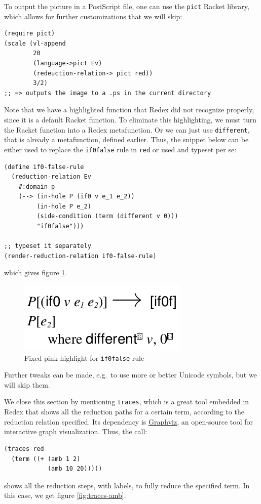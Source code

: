 To output the picture in a PostScript file, one can use the \texttt{pict}
Racket library, which allows for further customizations that we will skip:
{
  \small
\begin{verbatim}
(require pict)
(scale (vl-append
        20
        (language->pict Ev)
        (redeuction-relation-> pict red))
        3/2)
;; => outputs the image to a .ps in the current directory
\end{verbatim}
}

Note that we have a highlighted function that Redex did not recognize
properly, since it is a default Racket function. To eliminate this highlighting,
we must turn the Racket function into a Redex metafunction. Or we can just
use \texttt{different}, that is already a metafunction, defined earlier. Thus,
the snippet below can be either used to replace the \texttt{if0false} rule
in \texttt{red} or used and typeset per se:
{
  \small
\begin{verbatim}
(define if0-false-rule
  (reduction-relation Ev
    #:domain p
    (--> (in-hole P (if0 v e_1 e_2))
         (in-hole P e_2)
         (side-condition (term (different v 0)))
         "if0false")))

;; typeset it separately
(render-reduction-relation if0-false-rule)
\end{verbatim}
}
\noindent which gives figure \ref{fig:if0false}.

\begin{figure}[!htb]
  \centering
  \includegraphics[scale=0.3]{fig/if0false.png}
  \caption{Fixed pink highlight for \texttt{if0false} rule}
  \label{fig:if0false}
\end{figure}

Further tweaks can be made, e.g.\ to use more or better Unicode symbols,
but we will skip them.

We close this section by mentioning \texttt{traces}, which is a great tool
embedded in Redex that shows all the reduction paths for a certain term,
according to the reduction relation specified. Its dependency is
\href{https://graphviz.org/}{Graphviz}, an open-source tool for interactive
graph visualization. Thus, the call:
{
  \small
\begin{verbatim}
(traces red
  (term ((+ (amb 1 2)
            (amb 10 20)))))
\end{verbatim}
}
\noindent shows all the reduction steps, with labels, to fully reduce the specified
term. In this case, we get figure \ref{fig:traces-amb}.

